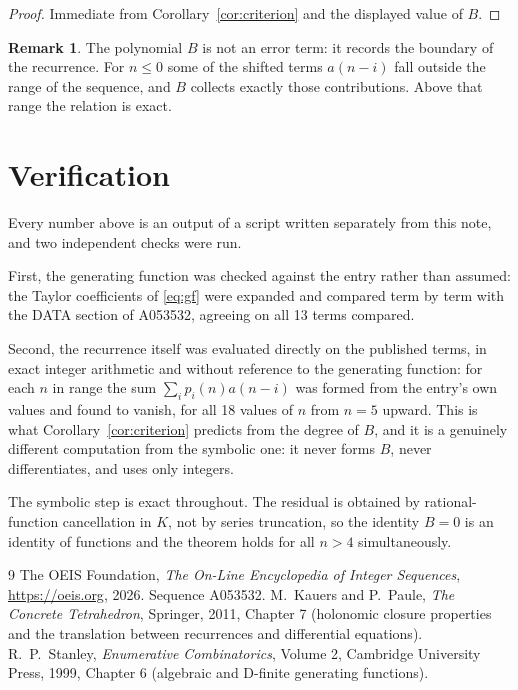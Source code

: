 \documentclass[11pt,a4paper]{article}
\theoremstyle{plain}
\theoremstyle{definition}
\newtheorem{remark}[theorem]{Remark}
\begin{document}
\begin{proof}
Immediate from Corollary~\ref{cor:criterion} and the displayed value of $B$.
\end{proof}

\begin{remark}
The polynomial $B$ is not an error term: it records the boundary of the recurrence. For
$n\le0$ some of the shifted terms $a(n-i)$ fall outside the range of the sequence,
and $B$ collects exactly those contributions. Above that range the relation is exact.
\end{remark}

\section{Verification}

Every number above is an output of a script written separately from this note, and two
independent checks were run.

First, the generating function was checked against the entry rather than assumed: the
Taylor coefficients of \eqref{eq:gf} were expanded and compared term by term with the DATA
section of A053532, agreeing on all 13 terms compared.

Second, the recurrence itself was evaluated directly on the published terms, in exact
integer arithmetic and without reference to the generating function: for each $n$ in range
the sum $\sum_{i}p_{i}(n)a(n-i)$ was formed from the entry's own values and found to
vanish, for all 18 values of $n$ from $n=5$ upward. This is what
Corollary~\ref{cor:criterion} predicts from the degree of $B$, and it is a genuinely
different computation from the symbolic one: it never forms $B$, never differentiates, and
uses only integers.

The symbolic step is exact throughout. The residual is obtained by rational-function
cancellation in $K$, not by series truncation, so the identity $B=0$ is an
identity of functions and the theorem holds for all $n>4$ simultaneously.

\begin{thebibliography}{9}
 The OEIS Foundation, \emph{The On-Line Encyclopedia of Integer Sequences},
\url{https://oeis.org}, 2026. Sequence A053532.
 M.~Kauers and P.~Paule, \emph{The Concrete Tetrahedron}, Springer, 2011,
Chapter 7 (holonomic closure properties and the translation between recurrences and
differential equations).
 R.~P.~Stanley, \emph{Enumerative Combinatorics}, Volume 2, Cambridge
University Press, 1999, Chapter 6 (algebraic and D-finite generating functions).
\end{thebibliography}
\end{document}
